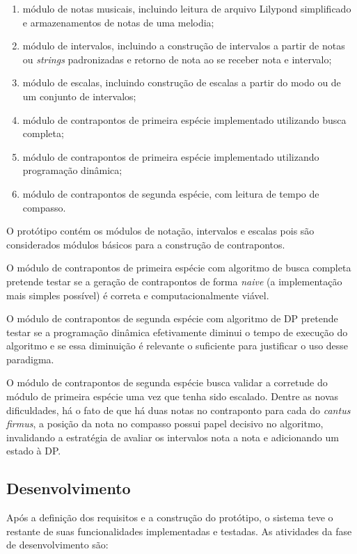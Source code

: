     \begin{enumerate}
      \item módulo de notas musicais, incluindo leitura de arquivo Lilypond simplificado e armazenamentos de notas de uma melodia;
      \item módulo de intervalos, incluindo a construção de intervalos a partir de notas ou \textit{strings} padronizadas e retorno de nota ao se receber nota e intervalo;
      \item módulo de escalas, incluindo construção de escalas a partir do modo ou de um conjunto de intervalos;
      \item módulo de contrapontos de primeira espécie implementado utilizando busca completa;
      \item módulo de contrapontos de primeira espécie implementado utilizando programação dinâmica;
      \item módulo de contrapontos de segunda espécie, com leitura de tempo de compasso.
    \end{enumerate}

    O protótipo contém os módulos de notação, intervalos e escalas pois são considerados módulos básicos para a construção de contrapontos.

    O módulo de contrapontos de primeira espécie com algoritmo de busca completa pretende testar se a geração de contrapontos de forma \textit{naive} (a implementação mais simples possível) é correta e computacionalmente viável.

    O módulo de contrapontos de segunda espécie com algoritmo de DP pretende testar se a programação dinâmica efetivamente diminui o tempo de execução do algoritmo e se essa diminuição é relevante o suficiente para justificar o uso desse paradigma.

    O módulo de contrapontos de segunda espécie busca validar a corretude do módulo de primeira espécie uma vez que tenha sido escalado. Dentre as novas dificuldades, há o fato de que há duas notas no contraponto para cada do \textit{cantus firmus}, a posição da nota no compasso possui papel decisivo no algoritmo, invalidando a estratégia de avaliar os intervalos nota a nota e adicionando um estado à DP.

  \subsection[Desenvolvimento]{Desenvolvimento}

    Após a definição dos requisitos e a construção do protótipo, o sistema teve o restante de suas funcionalidades implementadas e testadas. As atividades da fase de desenvolvimento são:

